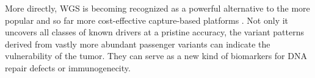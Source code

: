 \documentclass[phd,tocprelim]{cornell}
\begin{document}
More directly, WGS is becoming recognized as a powerful alternative to the more popular and so far more cost-effective capture-based platforms \cite{Meggendorfer2021-wo}. Not only it uncovers all classes of known drivers at a pristine accuracy, the variant patterns derived from vastly more abundant passenger variants can indicate the vulnerability of the tumor. They can serve as a new kind of biomarkers for DNA repair defects or immunogenecity.



\end{document}
